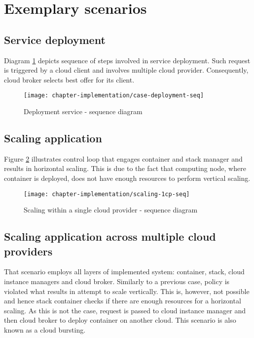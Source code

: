 \newpage
\section{Exemplary scenarios}

\subsection{Service deployment}
Diagram \ref{fig:case-deployment-seq} depicts sequence of steps involved in service deployment. Such request is triggered by a cloud client and involves multiple cloud provider. Consequently, cloud broker selects best offer for its client.

\begin{figure}[!ht]
  \begin{center}
    \texttt{[image: chapter-implementation/case-deployment-seq]}
  \end{center}
  \caption{Deployment service - sequence diagram}
  \label{fig:case-deployment-seq}
\end{figure}

\subsection{Scaling application}
Figure \ref{fig:scaling-1cp-seq} illustrates control loop that engages container and stack manager and results in horizontal scaling. This is due to the fact that computing node, where container is deployed, does not have enough resources to perform vertical scaling.

\begin{figure}[!ht]
  \begin{center}
    \texttt{[image: chapter-implementation/scaling-1cp-seq]}
  \end{center}
  \caption{Scaling within a single cloud provider - sequence diagram}
  \label{fig:scaling-1cp-seq}
\end{figure}

\subsection{Scaling application across multiple cloud providers}
That scenario employs all layers of implemented system: container, stack, cloud instance managers and cloud broker. Similarly to a previous case, policy is violated what results in attempt to scale vertically. This is, however, not possible and hence stack container checks if there are enough resources for a horizontal scaling. As this is not the case, request is passed to cloud instance manager and then cloud broker to deploy container on another cloud. This scenario is also known as a cloud bursting.

